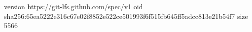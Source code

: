 version https://git-lfs.github.com/spec/v1
oid sha256:65ea5222e316c67e02f8852e522ce501993f6f515fb645ff5adcc813e21b54f7
size 5566
